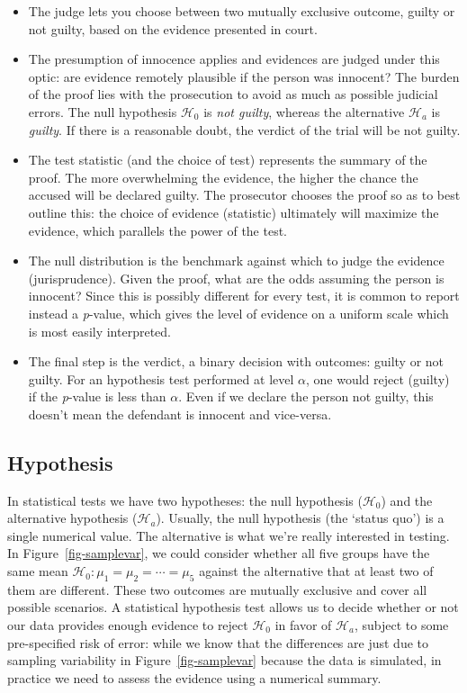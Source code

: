 \documentclass[
  11pt,
  letterpaper,
]{scrbook}
\providecommand{\tightlist}{%
  \setlength{\itemsep}{0pt}\setlength{\parskip}{0pt}}\usepackage{longtable,booktabs,array}
\theoremstyle{definition}
\theoremstyle{definition}
\theoremstyle{remark}
\begin{document}
\begin{itemize}
\tightlist
\item
  The judge lets you choose between two mutually exclusive outcome,
  guilty or not guilty, based on the evidence presented in court.
\item
  The presumption of innocence applies and evidences are judged under
  this optic: are evidence remotely plausible if the person was
  innocent? The burden of the proof lies with the prosecution to avoid
  as much as possible judicial errors. The null hypothesis
  \(\mathscr{H}_0\) is \emph{not guilty}, whereas the alternative
  \(\mathscr{H}_a\) is \emph{guilty}. If there is a reasonable doubt,
  the verdict of the trial will be not guilty.
\item
  The test statistic (and the choice of test) represents the summary of
  the proof. The more overwhelming the evidence, the higher the chance
  the accused will be declared guilty. The prosecutor chooses the proof
  so as to best outline this: the choice of evidence (statistic)
  ultimately will maximize the evidence, which parallels the power of
  the test.
\item
  The null distribution is the benchmark against which to judge the
  evidence (jurisprudence). Given the proof, what are the odds assuming
  the person is innocent? Since this is possibly different for every
  test, it is common to report instead a \emph{p}-value, which gives the
  level of evidence on a uniform scale which is most easily interpreted.
\item
  The final step is the verdict, a binary decision with outcomes: guilty
  or not guilty. For an hypothesis test performed at level \(\alpha\),
  one would reject (guilty) if the \emph{p}-value is less than
  \(\alpha\). Even if we declare the person not guilty, this doesn't
  mean the defendant is innocent and vice-versa.
\end{itemize}

\subsection{Hypothesis}\label{hypothesis-1}

In statistical tests we have two hypotheses: the null hypothesis
(\(\mathscr{H}_0\)) and the alternative hypothesis (\(\mathscr{H}_a\)).
Usually, the null hypothesis (the `status quo') is a single numerical
value. The alternative is what we're really interested in testing. In
Figure~\ref{fig-samplevar}, we could consider whether all five groups
have the same mean \(\mathscr{H}_0: \mu_1 = \mu_2 = \cdots = \mu_5\)
against the alternative that at least two of them are different. These
two outcomes are mutually exclusive and cover all possible scenarios. A
statistical hypothesis test allows us to decide whether or not our data
provides enough evidence to reject \(\mathscr{H}_0\) in favor of
\(\mathscr{H}_a\), subject to some pre-specified risk of error: while we
know that the differences are just due to sampling variability in
Figure~\ref{fig-samplevar} because the data is simulated, in practice we
need to assess the evidence using a numerical summary.
\end{document}
